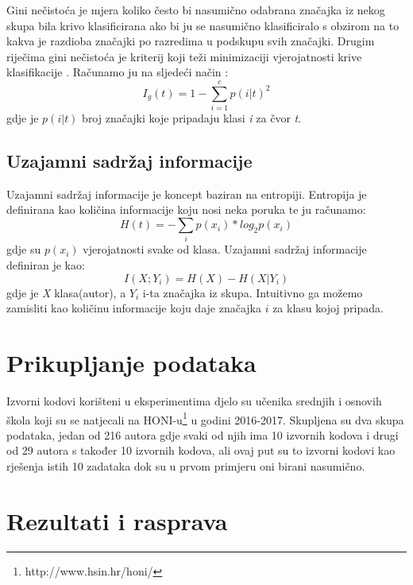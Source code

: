 Gini nečistoća je mjera koliko često bi nasumično odabrana značajka iz nekog skupa bila krivo klasificirana ako bi ju se nasumično klasificiralo s obzirom na to kakva je razdioba značajki po razredima u podskupu svih značajki. Drugim riječima gini nečistoća je kriterij koji teži minimizaciji vjerojatnosti krive klasifikacije \cite{cse}. Računamo ju na sljedeći način \cite{gidef}:
\begin{equation}
	I_g(t) = 1 -  \sum_{i=1}^{c} p(i | t)^{2}
\end{equation}
gdje je $p(i | t)$ broj značajki koje pripadaju klasi \textit{i} za čvor \textit{t}. 

\subsection{Uzajamni sadržaj informacije} \label{entropy}

Uzajamni sadržaj informacije je koncept baziran na entropiji. Entropija je definirana kao količina informacije koju nosi neka poruka te ju računamo:
\begin{equation}
		H(t) = - \sum_{i} p(x_{i}) * log_2 p(x_{i})
\end{equation}
gdje su $p(x_{i})$ vjerojatnosti svake od klasa. \newline
Uzajamni sadržaj informacije definiran je kao:
\begin{equation}
		I(X;Y_{i}) = H(X) - H(X | Y_{i})
\end{equation}
gdje je \textit{X} klasa(autor), a $Y_{i}$ i-ta značajka iz skupa. Intuitivno ga možemo zamisliti kao količinu informacije koju daje značajka $i$ za klasu kojoj pripada.

\section{Prikupljanje podataka}
Izvorni kodovi korišteni u eksperimentima djelo su učenika srednjih i osnovih škola koji su se natjecali na HONI-u\footnote{http://www.hsin.hr/honi/} u godini 2016-2017. Skupljena su dva skupa podataka, jedan od 216 autora gdje svaki od njih ima 10 izvornih kodova i drugi od 29 autora s također 10 izvornih kodova, ali ovaj put su to izvorni kodovi kao rješenja istih 10 zadataka dok su u prvom primjeru oni birani nasumično. 

\section{Rezultati i rasprava} \label{results}

